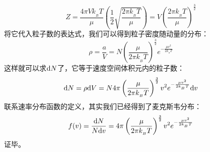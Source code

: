 \begin{prove}
\begin{equation}
                Z = \frac{4 \pi V k_{_B}T}{\mu} (\frac{1}{2}\sqrt{\frac{2\pi k_{_B}T}{\mu}}) = V\left(\frac{2\pi k_{_B}T}{\mu}\right)^{\frac{3}{2}}
                \label{of_Z}
            \end{equation}
            将它代入粒子数的表达式，我们可以得到粒子密度随动量的分布：
            \begin{equation}
                \rho = \frac{a}{V} = N\left(\frac{\mu}{2\pi k_{_B}T}\right)^{\frac{3}{2}}e^{-\frac{\mu v^{2}}{2k_{_B}T}}
            \end{equation}
            这样就可以求$\mathrm{d}{N}$了，它等于速度空间体积元内的粒子数：
            \begin{equation}
                \mathrm{d}{N} = \rho \mathrm{d}{V} = N4\pi \left(\frac{\mu}{2\pi k_{_B}T}\right)^{\frac{3}{2}}v^{2}e^{-\frac{\mu v^{2}}{2k_{_B}T}}\mathrm{d}{v}
            \end{equation}
            联系速率分布函数的定义，其实我们已经得到了麦克斯韦分布：
            \begin{equation}
                f(v) = \frac{\mathrm{d}{N}}{N\mathrm{d}{v}} = 4\pi \left(\frac{\mu}{2\pi k_{_B}T}\right)^{\frac{3}{2}}v^{2}e^{-\frac{\mu v^{2}}{2k_{_B}T}}
            \end{equation}
            证毕。
        \end{prove}
